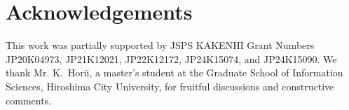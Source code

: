 \section*{Acknowledgements}
This work was partially supported by JSPS KAKENHI Grant Numbers JP20K04973, JP21K12021, JP22K12172, JP24K15074, and JP24K15090. 
We thank Mr. K.~Horii, a master's student at the Graduate School of Information Sciences, Hiroshima City University, for fruitful discussions and constructive comments.%
